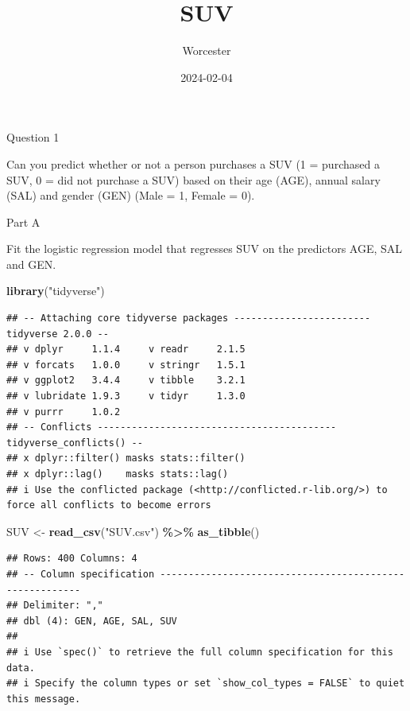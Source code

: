 \documentclass[
]{article}
\title{SUV}
\author{Worcester}
\date{2024-02-04}
\newenvironment{Shaded}{\begin{snugshade}}{\end{snugshade}}
\newcommand{\FunctionTok}[1]{\textcolor[rgb]{0.13,0.29,0.53}{\textbf{#1}}}
\newcommand{\NormalTok}[1]{#1}
\newcommand{\OtherTok}[1]{\textcolor[rgb]{0.56,0.35,0.01}{#1}}
\newcommand{\SpecialCharTok}[1]{\textcolor[rgb]{0.81,0.36,0.00}{\textbf{#1}}}
\newcommand{\StringTok}[1]{\textcolor[rgb]{0.31,0.60,0.02}{#1}}
\begin{document}
\maketitle

Question 1

Can you predict whether or not a person purchases a SUV (1 = purchased a
SUV, 0 = did not purchase a SUV) based on their age (AGE), annual salary
(SAL) and gender (GEN) (Male = 1, Female = 0).

Part A

Fit the logistic regression model that regresses SUV on the predictors
AGE, SAL and GEN.

\begin{Shaded}
\begin{Highlighting}[]
\FunctionTok{library}\NormalTok{(}\StringTok{"tidyverse"}\NormalTok{)}
\end{Highlighting}
\end{Shaded}

\begin{verbatim}
## -- Attaching core tidyverse packages ------------------------ tidyverse 2.0.0 --
## v dplyr     1.1.4     v readr     2.1.5
## v forcats   1.0.0     v stringr   1.5.1
## v ggplot2   3.4.4     v tibble    3.2.1
## v lubridate 1.9.3     v tidyr     1.3.0
## v purrr     1.0.2     
## -- Conflicts ------------------------------------------ tidyverse_conflicts() --
## x dplyr::filter() masks stats::filter()
## x dplyr::lag()    masks stats::lag()
## i Use the conflicted package (<http://conflicted.r-lib.org/>) to force all conflicts to become errors
\end{verbatim}

\begin{Shaded}
\begin{Highlighting}[]
\NormalTok{SUV }\OtherTok{\textless{}{-}} \FunctionTok{read\_csv}\NormalTok{(}\StringTok{"SUV.csv"}\NormalTok{) }\SpecialCharTok{\%\textgreater{}\%} 
  \FunctionTok{as\_tibble}\NormalTok{()}
\end{Highlighting}
\end{Shaded}

\begin{verbatim}
## Rows: 400 Columns: 4
## -- Column specification --------------------------------------------------------
## Delimiter: ","
## dbl (4): GEN, AGE, SAL, SUV
## 
## i Use `spec()` to retrieve the full column specification for this data.
## i Specify the column types or set `show_col_types = FALSE` to quiet this message.
\end{verbatim}
\end{document}
